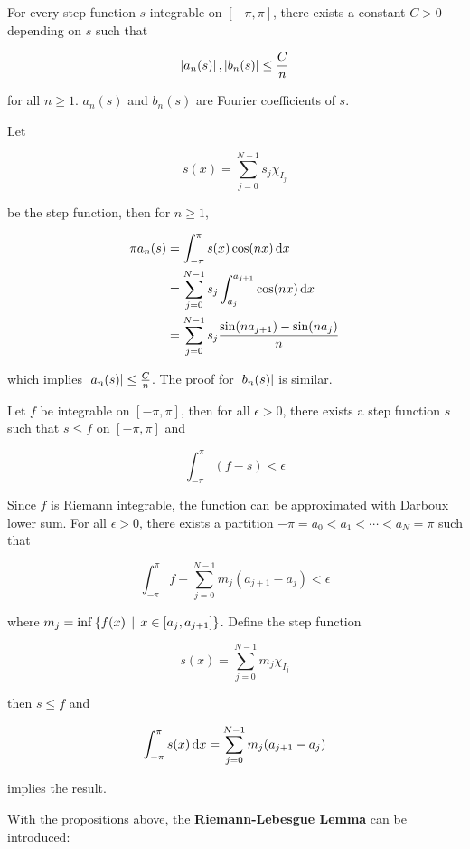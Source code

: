 \documentclass[a4paper,12pt]{article}
\begin{document}
\begin{pst}
  For every step function $s$ integrable on $[-\pi,\pi]$, there exists a constant $C>0$ depending on $s$ such that
  
  $$\left| a_{n}(s)\right|,\left| b_{n}(s)\right|\leq\frac{C}{n}$$\s

  for all $n\geq 1$. $a_{n}(s)$ and $b_{n}(s)$ are Fourier coefficients of $s$.\n

  \prf Let
  
  $$s(x)=\sum_{j=0}^{N-1}s_{j}\chi_{I_{j}}$$\s
  
  be the step function, then for $n\geq 1$,

  $$\begin{aligned}[t]
    \pi a_{n}(s)&=\int_{-\pi}^{\pi}s(x)\cos(nx)\,\mathrm{d} x\\
    &=\sum_{j=0}^{N-1}s_{j}\int_{a_{j}}^{a_{j+1}}\cos(nx)\,\mathrm{d} x\\
    &=\sum_{j=0}^{N-1}s_{j}\frac{\sin(na_{j+1})-\sin(na_{j})}{n}
  \end{aligned}$$\s

  which implies $\left| a_{n}(s)\right|\leq\frac{C}{n}$. The proof for $\left| b_{n}(s)\right|$ is similar.
\end{pst}\n

\begin{pst}
  Let $f$ be integrable on $[-\pi,\pi]$, then for all $\epsilon>0$, there exists a step function $s$ such that $s\leq f$ on $[-\pi,\pi]$ and

  $$\int_{-\pi}^{\pi}(f-s)<\epsilon$$\s

  \prf Since $f$ is Riemann integrable, the function can be approximated with Darboux lower sum. For all $\epsilon>0$, there exists a partition $-\pi=a_{0}<a_{1}<\cdots<a_{N}=\pi$ such that

  $$\int_{-\pi}^{\pi}f-\sum_{j=0}^{N-1}m_{j}(a_{j+1}-a_{j})<\epsilon$$\s

  where $m_{j}=\inf\left\{ f(x)\,\mid\, x\in[a_{j},a_{j+1}]\right\}$. Define the step function

  $$s(x)=\sum_{j=0}^{N-1}m_{j}\chi_{I_{j}}$$\s

  then $s\leq f$ and
  
  $$\int_{-\pi}^{\pi}s(x)\,\mathrm{d} x=\sum_{j=0}^{N-1}m_{j}(a_{j+1}-a_{j})$$\s

  implies the result.
\end{pst}\n

With the propositions above, the \textbf{Riemann-Lebesgue Lemma} can be introduced:\n
\end{document}
